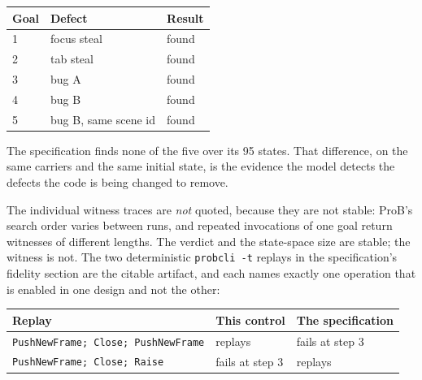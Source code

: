 \documentclass[a4paper,10pt,fleqn]{article}
\begin{document}
\begin{center}
\begin{tabular}{lll}
  \textbf{Goal} & \textbf{Defect} & \textbf{Result} \\
  \hline
  1 & focus steal & found \\
  2 & tab steal & found \\
  3 & bug A & found \\
  4 & bug B & found \\
  5 & bug B, same scene id & found \\
\end{tabular}
\end{center}

The specification finds none of the five over its 95 states.  That difference,
on the same carriers and the same initial state, is the evidence the model
detects the defects the code is being changed to remove.

The individual witness traces are \emph{not} quoted, because they are not
stable: ProB's search order varies between runs, and repeated invocations of one
goal return witnesses of different lengths.  The verdict and the state-space
size are stable; the witness is not.  The two deterministic
\texttt{probcli -t} replays in the specification's fidelity section are the
citable artifact, and each names exactly one operation that is enabled in one
design and not the other:

\begin{center}
\begin{tabular}{lll}
  \textbf{Replay} & \textbf{This control} & \textbf{The specification} \\
  \hline
  \texttt{PushNewFrame; Close; PushNewFrame} & replays & fails at step 3 \\
  \texttt{PushNewFrame; Close; Raise} & fails at step 3 & replays \\
\end{tabular}
\end{center}
\end{document}
